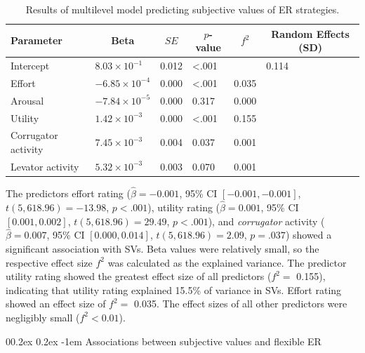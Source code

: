 \documentclass[
  man,floatsintext]{apa6}
\makeatletter
\let\oldparagraph\paragraph
\renewcommand{\paragraph}[1]{\oldparagraph{#1}\mbox{}}
\renewcommand{\paragraph}{\@startsection{paragraph}{4}{\parindent}%
  {0\baselineskip \@plus 0.2ex \@minus 0.2ex}%
  {-1em}%
  {\normalfont\normalsize\bfseries\itshape\typesectitle}}
\makeatother
\begin{document}
\begin{table}[H]

\begin{center}
\begin{threeparttable}

\caption{\label{tab:TabMLMH5}Results of multilevel model predicting subjective values of ER strategies.}

\begin{tabular}{llllll}
\toprule
Parameter & \multicolumn{1}{c}{Beta} & \multicolumn{1}{c}{$SE$} & \multicolumn{1}{c}{$p$-value} & \multicolumn{1}{c}{$f^{2}$} & \multicolumn{1}{c}{Random Effects (SD)}\\
\midrule
Intercept & $8.03 \times 10^{-1}$ & 0.012 & <.001 &  & 0.114\\
Effort & $-6.85 \times 10^{-4}$ & 0.000 & <.001 & 0.035 & \\
Arousal & $-7.84 \times 10^{-5}$ & 0.000 & 0.317 & 0.000 & \\
Utility & $1.42 \times 10^{-3}$ & 0.000 & <.001 & 0.155 & \\
Corrugator activity & $7.45 \times 10^{-3}$ & 0.004 & 0.037 & 0.001 & \\
Levator activity & $5.32 \times 10^{-3}$ & 0.003 & 0.070 & 0.001 & \\
\bottomrule
\end{tabular}

\end{threeparttable}
\end{center}

\end{table}

The predictors effort rating (\(\hat{\beta} = -0.001\), 95\% CI \([-0.001, -0.001]\), \(t(5,618.96) = -13.98\), \(p < .001\)), utility rating (\(\hat{\beta} = 0.001\), 95\% CI \([0.001, 0.002]\), \(t(5,618.96) = 29.49\), \(p < .001\)), and \emph{corrugator} activity (\(\hat{\beta} = 0.007\), 95\% CI \([0.000, 0.014]\), \(t(5,618.96) = 2.09\), \(p = .037\)) showed a significant association with SVs.
Beta values were relatively small, so the respective effect size \(f^{2}\) was calculated as the explained variance.
The predictor utility rating showed the greatest effect size of all predictors (\(f^{2}=\) 0.155), indicating that utility rating explained 15.5\% of variance in SVs.
Effort rating showed an effect size of \(f^{2}=\) 0.035.
The effect sizes of all other predictors were negligibly small (\(f^{2}< 0.01\)).

\hypertarget{associations-between-subjective-values-and-flexible-er}{%
\paragraph{Associations between subjective values and flexible ER}\label{associations-between-subjective-values-and-flexible-er}}
\end{document}
